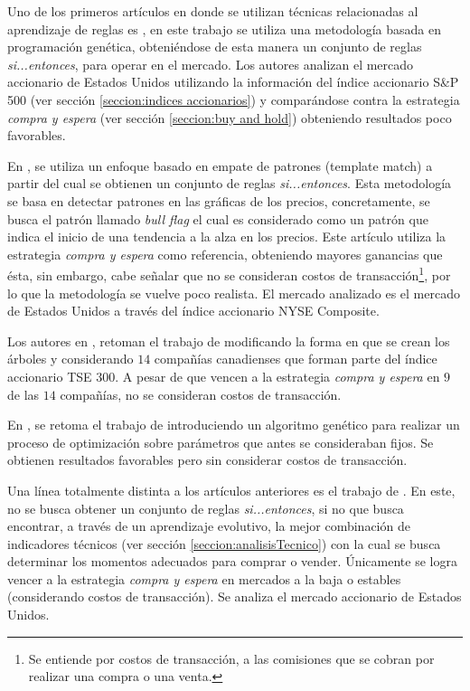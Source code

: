 \documentclass[12pt]{report}
\theoremstyle{break}
\theoremstyle{break}
\begin{document}
Uno de los primeros artículos en donde se utilizan técnicas relacionadas al aprendizaje de reglas es \cite{Allen1999}, en este trabajo se utiliza una metodología basada en programación genética, obteniéndose de esta manera un conjunto de reglas \textit{si...entonces}, para operar en el mercado. Los autores analizan el mercado accionario de Estados Unidos utilizando la información del índice accionario S\&P 500 (ver sección \ref{seccion:indices accionarios}) y comparándose contra la estrategia \textit{compra y espera} (ver sección \ref{seccion:buy and hold}) obteniendo resultados poco favorables.

En \cite{Leigh2002}, se utiliza un enfoque basado en empate de patrones (template match) a partir del cual se obtienen un conjunto de reglas \textit{si...entonces}. Esta metodología se basa en detectar patrones en las gráficas de los precios, concretamente, se busca el patrón llamado \textit{bull flag} el cual es considerado como un patrón que indica el inicio de una tendencia a la alza en los precios. Este artículo utiliza la estrategia \textit{compra y espera} como referencia, obteniendo mayores ganancias que ésta, sin embargo, cabe señalar que no se consideran costos de transacción\footnote{Se entiende por costos de transacción, a las comisiones que se cobran por realizar una compra o una venta.}, por lo que la metodología se vuelve poco realista. El mercado analizado es el mercado de Estados Unidos a través del índice accionario NYSE Composite.

Los autores en \cite{Potvin2004}, retoman el trabajo de \cite{Allen1999} modificando la forma en que se crean los árboles y considerando $14$ compañías canadienses que forman parte del índice accionario TSE $300$. A pesar de que vencen a la estrategia \textit{compra y espera} en $9$ de las $14$ compañías, no se consideran costos de transacción.

En \cite{Parracho2010}, se retoma el trabajo de \cite{Leigh2002} introduciendo un algoritmo genético para realizar un proceso de optimización sobre parámetros que antes se consideraban fijos. Se obtienen resultados favorables pero sin considerar costos de transacción.

Una línea totalmente distinta a los artículos anteriores es el trabajo de \cite{Kaucic2010}. En este, no se busca obtener un conjunto de reglas \textit{si...entonces}, si no que busca encontrar, a través de un aprendizaje evolutivo, la mejor combinación de indicadores técnicos (ver sección \ref{seccion:analisisTecnico}) con la cual se busca determinar los momentos adecuados para comprar o vender. Únicamente se logra vencer a la estrategia \textit{compra y espera} en mercados a la baja o estables (considerando costos de transacción). Se analiza el mercado accionario de Estados Unidos.
\end{document}
